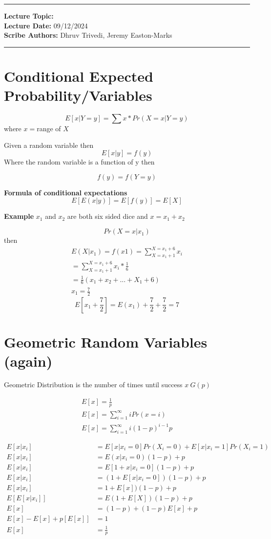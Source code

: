 \hrule
\vspace{0.1in}
\noindent
\textbf{Lecture Topic: } \\
\textbf{Lecture Date: } 09/12/2024 \\
\textbf{Scribe Authors: }Dhruv Trivedi, Jeremy Easton-Marks
\vspace{0.1in}
\hrule
\vspace{0.1in}

\section*{Conditional Expected Probability/Variables}
\[
E[x|Y=y] = \sum x * Pr(X=x|Y=y)
\]
where $x = $range of $X$

Given a random variable then
\[
E[x|y] = f(y)
\]
Where the random variable is a function of y then

\[
f(y) = f(Y=y)
\]

\textbf{Formula of conditional expectations}
\[
E[E(x|y)]=E[f(y)]=E[X]
\]


\textbf{Example}
$x_1$ and $x_2$ are both six sided dice and $x = x_1 + x_2$

\[
Pr(X=x|x_1)
\]
then
\[
\begin{aligned}
E(X|x_1) = f(x1)=\sum_{X=x_1+1}^{X=x_1+6} x_i \\
=\sum_{X=x_1+1}^{X=x_1+6} x_i * \frac{1}{6} \\
= \frac{1}{6}(x_1 + x_2 + ... + X_1+6) \\
x_1 = \frac{7}{2}
\end{aligned}
\]
\[
E[x_1 + \frac{7}{2}] = E(x_1) + \frac{7}{2} + \frac{7}{2} = 7
\]

\section*{Geometric Random Variables (again)}
Geometric Distribution is the number of times until success $x ~ G(p)$

\[
\begin{aligned}
    E[x] = \frac{1}{p} \\
    E[x] = \sum_{i=1}^{\infty} i Pr(x=i) \\
    E[x] = \sum_{i=1}^{\infty} i (1 - p)^{i-1}p
\end{aligned}
\]

\[
\begin{aligned}
E[x | x_i] & = E[x|x_i=0]Pr(X_i=0) + E[x|x_i=1]Pr(X_i=1) \\
E[x | x_i] & = E(x|x_i=0)(1-p)+p \\
E[x | x_i] & = E[1+x|x_i=0](1-p) + p \\
E[x | x_i] & = (1 + E[x|x_i=0])(1-p) + p \\
E[x | x_i] & = 1 + E[x])(1-p) + p \\
E[E[x | x_i]] & = E(1+E[X])(1-p) + p \\
E[x]&  = (1-p) + (1-p)E[x] + p \\
E[x] - E[x] + p[E[x]] & =1 \\
E[x] & = \frac{1}{p}
\end{aligned}
\]

